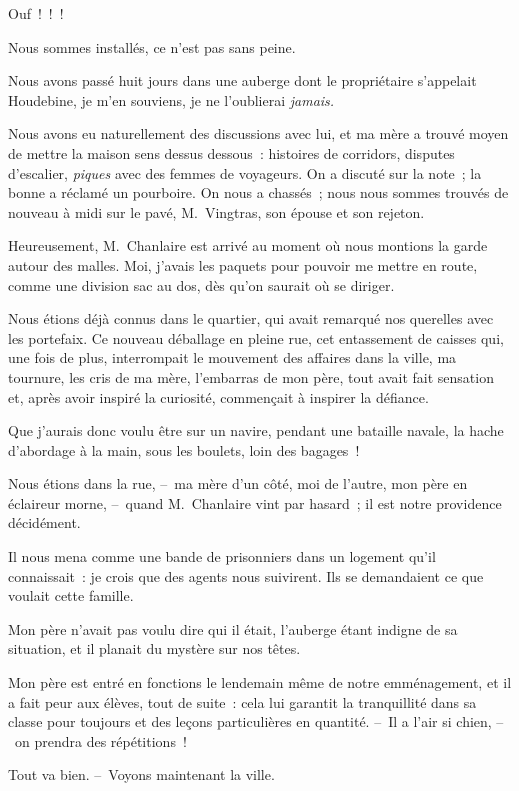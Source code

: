 \documentclass[french,twoside]{book} %
\begin{document}
\bigbreak
\noindent Ouf ! ! !\par
Nous sommes installés, ce n’est pas sans peine.\par
Nous avons passé huit jours dans une auberge dont le propriétaire s’appelait Houdebine, je m’en souviens, je ne l’oublierai \emph{jamais.}\par
Nous avons eu naturellement des discussions avec lui, et ma mère a trouvé moyen de mettre la maison sens dessus dessous : histoires de corridors, disputes d’escalier, \emph{piques} avec des femmes de voyageurs. On a discuté sur la note ; la bonne a réclamé un pourboire. On nous a chassés ; nous nous sommes trouvés de nouveau à midi sur le pavé, M. Vingtras, son épouse et son rejeton.\par
Heureusement, M. Chanlaire est arrivé au moment où nous montions la garde autour des malles. Moi, j’avais les paquets pour pouvoir me mettre en route, comme une division sac au dos, dès qu’on saurait où se diriger.\par
Nous étions déjà connus dans le quartier, qui avait remarqué nos querelles avec les portefaix. Ce nouveau déballage en pleine rue, cet entassement de caisses qui, une fois de plus, interrompait le mouvement des affaires dans la ville, ma tournure, les cris de ma mère, l’embarras de mon père, tout avait fait sensation et, après avoir inspiré la curiosité, commençait à inspirer la défiance.\par
Que j’aurais donc voulu être sur un navire, pendant une bataille navale, la hache d’abordage à la main, sous les boulets, loin des bagages !\par
Nous étions dans la rue, – ma mère d’un côté, moi de l’autre, mon père en éclaireur morne, – quand M. Chanlaire vint par hasard ; il est notre providence décidément.\par
Il nous mena comme une bande de prisonniers dans un logement qu’il connaissait : je crois que des agents nous suivirent. Ils se demandaient ce que voulait cette famille.\par
Mon père n’avait pas voulu dire qui il était, l’auberge étant indigne de sa situation, et il planait du mystère sur nos têtes.\par
\bigbreak
\noindent Mon père est entré en fonctions le lendemain même de notre emménagement, et il a fait peur aux élèves, tout de suite : cela lui garantit la tranquillité dans sa classe pour toujours et des leçons particulières en quantité. – Il a l’air si chien, – on prendra des répétitions !\par
Tout va bien. – Voyons maintenant la ville.\par
\end{document}
